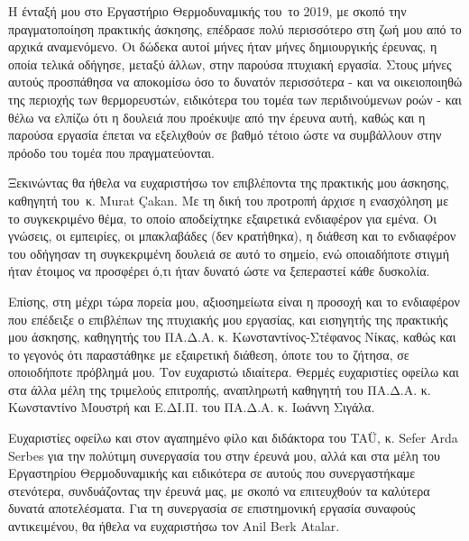 
\begin{preface}

\noindent Η ένταξή μου στο Εργαστήριο Θερμοδυναμικής του \ITU\,το 2019, με σκοπό την πραγματοποίηση πρακτικής άσκησης, επέδρασε πολύ περισσότερο στη ζωή μου από το αρχικά αναμενόμενο. Οι δώδεκα αυτοί μήνες ήταν μήνες δημιουργικής έρευνας, η οποία τελικά οδήγησε, μεταξύ άλλων, στην παρούσα πτυχιακή εργασία. Στους μήνες αυτούς προσπάθησα να αποκομίσω όσο το δυνατόν περισσότερα - και να οικειοποιηθώ της περιοχής των θερμορευστών, ειδικότερα του τομέα των περιδινούμενων ροών - και θέλω να ελπίζω ότι η δουλειά που προέκυψε από την έρευνα αυτή, καθώς και η παρούσα εργασία έπεται να εξελιχθούν σε βαθμό τέτοιο ώστε να συμβάλλουν στην πρόοδο του τομέα που πραγματεύονται.

Ξεκινώντας θα ήθελα να ευχαριστήσω τον επιβλέποντα της πρακτικής μου άσκησης, καθηγητή του \ITU\,κ. Murat Çakan. Με τη δική του προτροπή άρχισε η ενασχόληση με το συγκεκριμένο θέμα, το οποίο αποδείχτηκε εξαιρετικά ενδιαφέρον για εμένα. Οι γνώσεις, οι εμπειρίες, οι μπακλαβάδες (δεν κρατήθηκα), η διάθεση και το ενδιαφέρον του οδήγησαν τη συγκεκριμένη δουλειά σε αυτό το σημείο, ενώ οποιαδήποτε στιγμή ήταν έτοιμος να προσφέρει ό,τι ήταν δυνατό ώστε να ξεπεραστεί κάθε δυσκολία.

Επίσης, στη μέχρι τώρα πορεία μου, αξιοσημείωτα είναι η προσοχή και το ενδιαφέρον που επέδειξε ο επιβλέπων της πτυχιακής μου εργασίας, και εισηγητής της πρακτικής μου άσκησης, καθηγητής του ΠΑ.Δ.Α. κ. Κωνσταντίνος-Στέφανος Νίκας, καθώς και το γεγονός ότι παραστάθηκε με εξαιρετική διάθεση, όποτε του το ζήτησα, σε οποιοδήποτε πρόβλημά μου. Τον ευχαριστώ ιδιαίτερα. Θερμές ευχαριστίες οφείλω και στα άλλα μέλη της τριμελούς επιτροπής, αναπληρωτή καθηγητή του ΠΑ.Δ.Α. κ. Κωνσταντίνο Μουστρή και Ε.ΔΙ.Π. του ΠΑ.Δ.Α. κ. Ιωάννη Σιγάλα.

Ευχαριστίες οφείλω και στον αγαπημένο φίλο και διδάκτορα του TAÜ, κ. Sefer Arda Serbes για την πολύτιμη συνεργασία του στην έρευνά μου, αλλά και στα μέλη του Εργαστηρίου Θερμοδυναμικής και ειδικότερα σε αυτούς που συνεργαστήκαμε στενότερα, συνδυάζοντας την έρευνά μας, με σκοπό να επιτευχθούν τα καλύτερα δυνατά αποτελέσματα. Για τη συνεργασία σε επιστημονική εργασία συναφούς αντικειμένου, θα ήθελα να ευχαριστήσω τον Anil Berk Atalar. \newpage
\thispagestyle{plain}


\end{preface}
